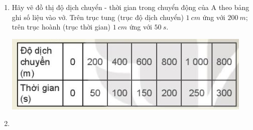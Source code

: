 \begin{enumerate}[label=\bfseries Câu \arabic*:]
	\item {}
	
	{
		Hãy vẽ đồ thị độ dịch chuyển - thời gian trong chuyển động của A theo bảng ghi số liệu vào vở. Trên trục tung (trục độ dịch chuyển) $\SI{1}{cm}$ ứng với $\SI{200}{m}$; trên trục hoành (trục thời gian) $\SI{1}{cm}$ ứng với $\SI{50}{s}$.
		
		\begin{center}
			\includegraphics[scale=1]{../figs/VN10-2022-PH-TP006-5.jpg}
		\end{center}
		
	}

	\item {}
	

\end{enumerate}
